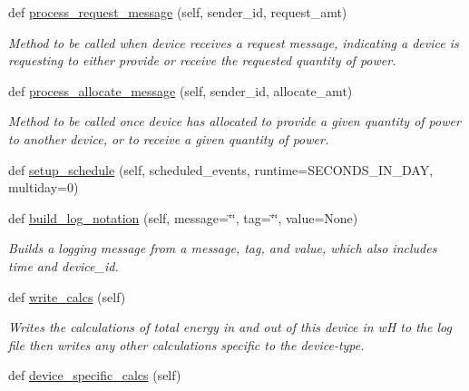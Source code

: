 \begin{DoxyCompactItemize}
def \hyperlink{class_build_1_1_objects_1_1device_1_1_device_a83c4bc3f6628bc2ba3343b96c5a441f8}{process\+\_\+request\+\_\+message} (self, sender\+\_\+id, request\+\_\+amt)
\begin{DoxyCompactList}\small\item\em Method to be called when device receives a request message, indicating a device is requesting to either provide or receive the requested quantity of power. \end{DoxyCompactList}\item 
def \hyperlink{class_build_1_1_objects_1_1device_1_1_device_af80aeef7fa18bef428cb622fc9d23d2c}{process\+\_\+allocate\+\_\+message} (self, sender\+\_\+id, allocate\+\_\+amt)
\begin{DoxyCompactList}\small\item\em Method to be called once device has allocated to provide a given quantity of power to another device, or to receive a given quantity of power. \end{DoxyCompactList}\item 
def \hyperlink{class_build_1_1_objects_1_1device_1_1_device_a06ffd25b07e6361e4ecb1e3432cff477}{setup\+\_\+schedule} (self, scheduled\+\_\+events, runtime=S\+E\+C\+O\+N\+D\+S\+\_\+\+I\+N\+\_\+\+D\+AY, multiday=0)
\item 
def \hyperlink{class_build_1_1_objects_1_1device_1_1_device_a94094fa08f506cd2f02e0d4a9611153d}{build\+\_\+log\+\_\+notation} (self, message=\char`\"{}\char`\"{}, tag=\char`\"{}\char`\"{}, value=None)
\begin{DoxyCompactList}\small\item\em Builds a logging message from a message, tag, and value, which also includes time and device\+\_\+id. \end{DoxyCompactList}\item 
def \hyperlink{class_build_1_1_objects_1_1device_1_1_device_aff92b20a263ce0f7a715789305ca0d30}{write\+\_\+calcs} (self)
\begin{DoxyCompactList}\small\item\em Writes the calculations of total energy in and out of this device in wH to the log file then writes any other calculations specific to the device-\/type. \end{DoxyCompactList}\item 
\mbox{\label{class_build_1_1_objects_1_1device_1_1_device_a1027097a4c8bedb6abf9d52f41e194f9}} 
def \hyperlink{class_build_1_1_objects_1_1device_1_1_device_a1027097a4c8bedb6abf9d52f41e194f9}{device\+\_\+specific\+\_\+calcs} (self)

\end{DoxyCompactItemize}
